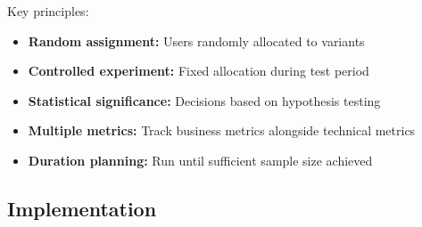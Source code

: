 Key principles:
\begin{itemize}
    \item \textbf{Random assignment:} Users randomly allocated to variants
    \item \textbf{Controlled experiment:} Fixed allocation during test period
    \item \textbf{Statistical significance:} Decisions based on hypothesis testing
    \item \textbf{Multiple metrics:} Track business metrics alongside technical metrics
    \item \textbf{Duration planning:} Run until sufficient sample size achieved
\end{itemize}

\subsection{Implementation}

